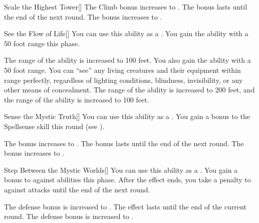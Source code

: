 {\begin{freeability}{Scale the Highest Tower}[]
                \rankline
                 The Climb bonus increases to .
                 The bonus lasts until the end of the next round.
                 The bonus increases to .
            \end{freeability}

            \begin{freeability}{See the Flow of Life}[]
                You can use this ability as a .
                You gain the  ability with a 50 foot range this phase.

                \rankline
                 The range of the  ability is increased to 100 feet.
                 You also gain the  ability with a 50 foot range.
                You can ``see'' any living creatures and their equipment within range perfectly, regardless of lighting conditions, blindness, invisibility, or any other means of concealment.
                 The range of the  ability is increased to 200 feet, and the range of the  ability is increased to 100 feet.
            \end{freeability}

            \begin{freeability}{Sense the Mystic Truth}[]
                You can use this ability as a .
                You gain a  bonus to the Spellsense skill this round (see ).

                \rankline
                 The bonus increases to .
                 The bonus lasts until the end of the next round.
                 The bonus increases to .
            \end{freeability}

            \begin{freeability}{Step Between the Mystic Worlds}[]
                You can use this ability as a .
                You gain a  bonus to  against  abilities this phase.
                After the effect ends, you take a  penalty to  against  attacks until the end of the next round.

                \rankline
                 The defense bonus is increased to .
                 The effect lasts until the end of the current round.
                 The defense bonus is increased to .
            \end{freeability}

}
